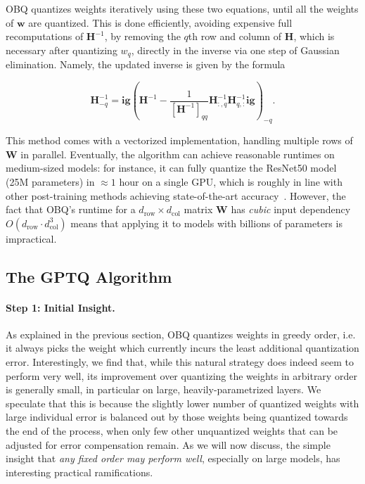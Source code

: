 OBQ quantizes weights iteratively using these two equations, until all the weights of $\mathbf{w}$  are quantized. This is done efficiently, avoiding expensive full recomputations of $\mathbf{H}^{-1}$, by removing the $q$th row and column of $\mathbf{H}$, which is necessary after quantizing $w_q$, directly in the inverse via one step of Gaussian elimination. Namely, the updated inverse is given by the formula

\begin{equation}
    \label{eq:inv-update}
    \mathbf{H}_{-q}^{-1} = \mathbf{ig}(\mathbf{H}^{-1} - \frac{1}{[\mathbf{H}^{-1}]_{qq}} \mathbf{H}^{-1}_{:, q} \mathbf{H}^{-1}_{q, :} \mathbf{ig})_{-q}.
\end{equation}

This method comes with a vectorized implementation, handling multiple rows of $\mathbf{W}$ in parallel. Eventually, the algorithm can achieve reasonable runtimes on medium-sized models: for instance, it can fully quantize the  ResNet50 model (25M parameters) in $\approx 1$ hour on a single GPU, which is roughly in line with other post-training methods achieving state-of-the-art accuracy~\cite{frantar2022obc}. However, the fact that OBQ's runtime for a $d_\text{row} \times d_\text{col}$ matrix $\mathbf{W}$ has \emph{cubic} input dependency $O(d_\text{row} \cdot d_\text{col}^3)$ means that applying it to models with billions of parameters is impractical.

\subsection{The GPTQ Algorithm}
\label{sec:gptq}

\paragraph{Step 1: Initial Insight.} As explained in the previous section, OBQ quantizes weights in greedy order, i.e. it always picks the weight which currently incurs the least additional quantization error. Interestingly, we find that, while this natural strategy does indeed seem to perform very well, its improvement over quantizing the weights in arbitrary order is generally small, in particular on large, heavily-parametrized layers. We speculate that this is because the slightly lower number of quantized weights with large individual error is balanced out by those weights being quantized towards the end of the process, when only few other unquantized weights that can be adjusted for error compensation remain. As we will now discuss, the simple insight that \emph{any fixed order may perform well}, especially on large models, has interesting practical ramifications.

